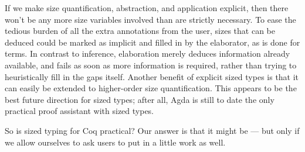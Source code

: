 If we make size quantification, abstraction, and application explicit,
then there won't be any more size variables involved than are strictly necessary.
To ease the tedious burden of all the extra annotations from the user,
sizes that can be deduced could be marked as implicit and filled in by the elaborator, as is done for terms.
In contrast to inference, elaboration merely deduces information already available,
and fails as soon as more information is required,
rather than trying to heuristically fill in the gaps itself.
Another benefit of explicit sized types is that it can easily be extended to higher-order size quantification.
This appears to be the best future direction for sized types;
after all, Agda is still to date the only practical proof assistant with sized types.

So is sized typing for Coq practical?
Our answer is that it might be --- but only if we allow ourselves to ask users to put in a little work as well.

